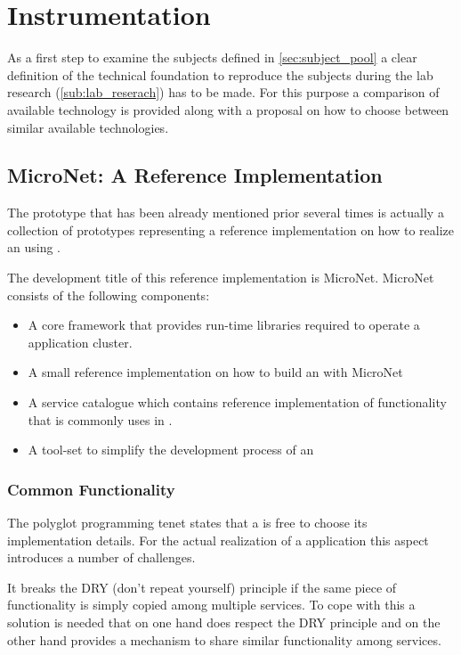 \section{Instrumentation}
\label{sub:instrumentation}

As a first step to examine the subjects defined in \autoref{sec:subject_pool} a
clear definition of the technical foundation to reproduce the subjects during
the lab research (\autoref{sub:lab_reserach}) has to be made. For this purpose a
comparison of available technology is provided along with a proposal on how to
choose between similar available technologies.

\subsection{MicroNet: A Reference Implementation}

The prototype that has been already mentioned prior 
several times is actually a collection of prototypes representing a reference
implementation on how to realize an \og{} using \ms{}.

The development title of this reference implementation is MicroNet.
MicroNet consists of the following components:

\begin{itemize}
  \item A core framework that provides run-time libraries required to operate a
  \ms{} \og{} application cluster.
  \item A small reference implementation on how to build an \og{} with MicroNet
  \item A service catalogue which contains reference implementation of
  functionality that is commonly uses in \ogs{}.
  \item A tool-set to simplify the development process of an \og{} 
\end{itemize}

\subsubsection{Common Functionality}

The polyglot programming tenet states that a \ms{} is free to choose its
implementation details. For the actual realization of a \ms{} application
this aspect introduces a number of challenges. 

It breaks the DRY (don't repeat yourself) principle if the same piece of
functionality is simply copied among multiple services. To cope with this a
solution is needed that on one hand does respect the DRY principle and on the
other hand provides a mechanism to share similar functionality among services.

